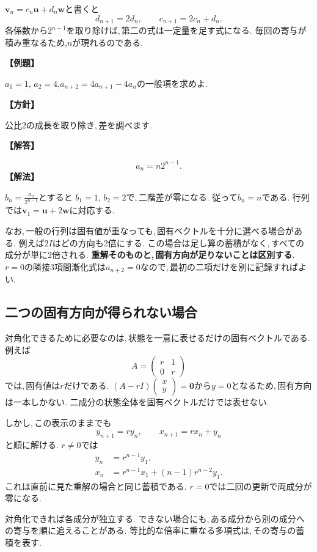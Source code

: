 $\boldsymbol v_n=c_n\boldsymbol u+d_n\boldsymbol w$と書くと
\[
 d_{n+1}=2d_n,\qquad c_{n+1}=2c_n+d_n.
\]
各係数から$2^{n-1}$を取り除けば,\,第二の式は一定量を足す式になる.
毎回の寄与が積み重なるため,$n$が現れるのである.

\noindent\textbf{【例題】}\par\nobreak
$a_1=1,\,a_2=4$,$a_{n+2}=4a_{n+1}-4a_n$の一般項を求めよ.

\noindent\textbf{【方針】}\par\nobreak
公比2の成長を取り除き,\,差を調べます.

\noindent\textbf{【解答】}\par\nobreak
\[
 a_n=n2^{n-1}.
\]
\noindent\textbf{【解法】}\par\nobreak
$b_n=\frac{a_n}{2^{n-1}}$とすると
$b_1=1,\,b_2=2$で,\,二階差が零になる.
従って$b_n=n$である.
行列では$\boldsymbol v_1=\boldsymbol u+2\boldsymbol w$に対応する.

なお,\,一般の行列は固有値が重なっても,\,固有ベクトルを十分に選べる場合がある.
例えば$2I$はどの方向も2倍にする.
この場合は足し算の蓄積がなく,\,すべての成分が単に2倍される.
\textbf{重解そのものと,\,固有方向が足りないことは区別する}.
$r=0$の隣接3項間漸化式は$a_{n+2}=0$なので,\,最初の二項だけを別に記録すればよい.

\subsection{二つの固有方向が得られない場合}

対角化できるために必要なのは,\,状態を一意に表せるだけの固有ベクトルである.
例えば
\[
 A=\begin{pmatrix}r&1\\0&r\end{pmatrix}
\]
では,\,固有値は$r$だけである.
$(A-rI)\begin{pmatrix}x\\y\end{pmatrix}=\boldsymbol0$から$y=0$となるため,\,固有方向は一本しかない.
二成分の状態全体を固有ベクトルだけでは表せない.

しかし,\,この表示のままでも
\[
 y_{n+1}=ry_n,\qquad x_{n+1}=rx_n+y_n
\]
と順に解ける.
$r\ne0$では
\[
 \begin{aligned}
 y_n&=r^{n-1}y_1,\\
 x_n&=r^{n-1}x_1+(n-1)r^{n-2}y_1.
 \end{aligned}
\]
これは直前に見た重解の場合と同じ蓄積である.
$r=0$では二回の更新で両成分が零になる.

\begin{bookpoint}
対角化できれば各成分が独立する.
できない場合にも,\,ある成分から別の成分への寄与を順に追えることがある.
等比的な倍率に重なる多項式は,\,その寄与の蓄積を表す.
\end{bookpoint}
